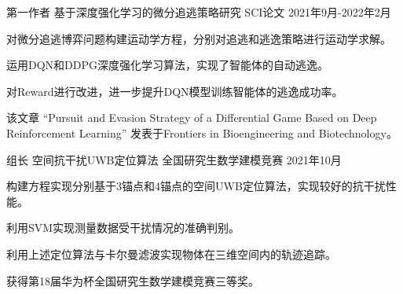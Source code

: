 

\begin{cventries}

  \cventry
    {第一作者} %
    {基于深度强化学习的微分追逃策略研究} %
    {SCI论文} %
    {2021年9月-2022年2月} %
    {
      \begin{cvitems} %
        \item {对微分追逃博弈问题构建运动学方程，分别对追逃和逃逸策略进行运动学求解。}
        \item {运用DQN和DDPG深度强化学习算法，实现了智能体的自动逃逸。}
        \item {对Reward进行改进，进一步提升DQN模型训练智能体的逃逸成功率。}
        \item {该文章 “Pursuit and Evasion Strategy of a Differential Game Based on Deep Reinforcement Learning” 发表于Frontiers in Bioengineering and Biotechnology。}
      \end{cvitems}
    }


  \cventry
    {组长} %
    {空间抗干扰UWB定位算法} %
    {全国研究生数学建模竞赛} %
    {2021年10月} %
    {
      \begin{cvitems} %
        \item {构建方程实现分别基于3锚点和4锚点的空间UWB定位算法，实现较好的抗干扰性能。}
        \item {利用SVM实现测量数据受干扰情况的准确判别。}
        \item {利用上述定位算法与卡尔曼滤波实现物体在三维空间内的轨迹追踪。}
        \item {获得第18届华为杯全国研究生数学建模竞赛三等奖。}
      \end{cvitems}
    }


\end{cventries}
